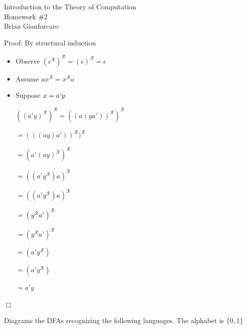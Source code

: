 \documentclass[11pt]{article}
\newcommand{\question}[2] {\vspace{.25in} \fbox{#1} #2 \vspace{.10in}}
\begin{document}
\medskip                        %


\begin{center}                  %
  {\Large Introduction to the Theory of Computation \\ Homework \#2} \\
  Brian Gianforcaro \\
  \date \\
\end{center}

\ttfamily

\question{1}{Proof: By structural induction}
\begin{center}
  \begin{itemize}
    \item Observe $({\epsilon}^{\mathcal{R}})^{\mathcal{R}} = ({\epsilon})^{\mathcal{R}} = {\epsilon}$
    \item Assume $ax^{\mathcal{R}} = x^{\mathcal{R}}a$
    \item Suppose $x = a`y$

    $((a'y)^{\mathcal{R}})^{\mathcal{R}} = ((a (ya'))^{\mathcal{R}})^{\mathcal{R}} $

    $ = (((ay)a'))^{\mathcal{R}})^{\mathcal{R}} $

    $ = (a'(ay)^{\mathcal{R}})^{\mathcal{R}} $

    $ = ((a'y^{\mathcal{R}})a)^{\mathcal{R}} $

    $ = ((a'y^{\mathcal{R}})a)^{\mathcal{R}} $

    $ = (y^{\mathcal{R}}a')^{\mathcal{R}} $

    $ = (y^{\mathcal{R}}a')^{\mathcal{R}} $

    $ = (a'y^{\mathcal{R}}) $

    $ = (a'y^{\mathcal{R}}) $
    
    $ = a'y $

  \end{itemize}
\end{center}

\indent \indent $\Box$

\question{2}{Diagrams the DFAs recognizing the following languages. The alphabet is $\{0,1\}$}
\end{document}
